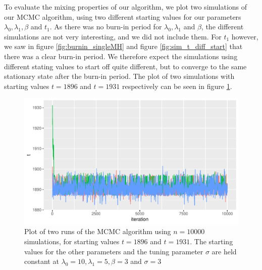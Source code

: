 




To evaluate the mixing properties of our algorithm, we plot two simulations of our MCMC algorithm, using two different starting values for our parameters $\lambda_0, \lambda_1, \beta$ and $t_1$. As there was no burn-in period for $\lambda_0, \lambda_1$ and $\beta$, the different simulations are not very interesting, and we did not include them. For $t_1$ however, we saw in figure \ref{fig:burnin_singleMH} and figure \ref{fig:sim_t_diff_start} that there was a clear burn-in period. We therefore expect the simulations using different stating values to start off quite different, but to converge to the same stationary state after the burn-in period. The plot of two simulations with starting values $t = 1896$ and $t = 1931$ respectively can be seen in figure \ref{fig:sim_mixing_t}.

\begin{figure}
    \centering
    \includegraphics[width = \textwidth]{Images/mixing_.pdf}
    \caption{Plot of two runs of the MCMC algorithm using $n = 10000$ simulations, for starting values $t = 1896$ and $t = 1931$. The starting values for the other parameters and the tuning parameter $\sigma$ are held constant at $\lambda_0 = 10, \lambda_1 = 5, \beta = 3$ and $\sigma = 3$}
    \label{fig:sim_mixing_t}
\end{figure}

